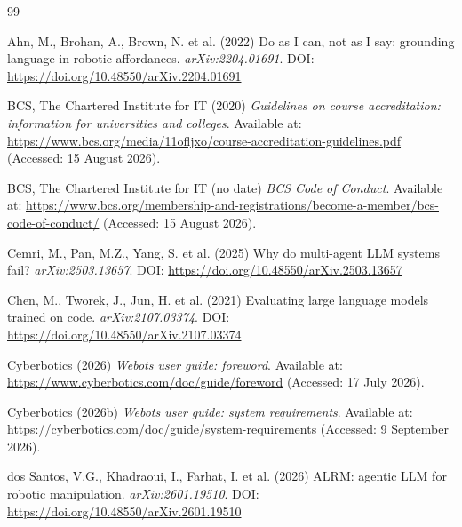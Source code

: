 \documentclass[11pt,a4paper]{report}
\begin{document}
\renewcommand{\bibname}{References}
\clearpage
{}
{}
\begin{thebibliography}{99}
\setlength{\itemsep}{0pt}
\setlength{\parsep}{0pt}

 Ahn, M., Brohan, A., Brown, N. et al. (2022) Do as I can, not as I say: grounding language in robotic affordances. \textit{arXiv:2204.01691}. DOI: \url{https://doi.org/10.48550/arXiv.2204.01691}

 BCS, The Chartered Institute for IT (2020) \textit{Guidelines on course accreditation: information for universities and colleges}. Available at: \url{https://www.bcs.org/media/11ofljxo/course-accreditation-guidelines.pdf} (Accessed: 15 August 2026).

 BCS, The Chartered Institute for IT (no date) \textit{BCS Code of Conduct}. Available at: \url{https://www.bcs.org/membership-and-registrations/become-a-member/bcs-code-of-conduct/} (Accessed: 15 August 2026).

 Cemri, M., Pan, M.Z., Yang, S. et al. (2025) Why do multi-agent LLM systems fail? \textit{arXiv:2503.13657}. DOI: \url{https://doi.org/10.48550/arXiv.2503.13657}

 Chen, M., Tworek, J., Jun, H. et al. (2021) Evaluating large language models trained on code. \textit{arXiv:2107.03374}. DOI: \url{https://doi.org/10.48550/arXiv.2107.03374}

 Cyberbotics (2026) \textit{Webots user guide: foreword}. Available at: \url{https://www.cyberbotics.com/doc/guide/foreword} (Accessed: 17 July 2026).

 Cyberbotics (2026b) \textit{Webots user guide: system requirements}. Available at: \url{https://cyberbotics.com/doc/guide/system-requirements} (Accessed: 9 September 2026).

 dos Santos, V.G., Khadraoui, I., Farhat, I. et al. (2026) ALRM: agentic LLM for robotic manipulation. \textit{arXiv:2601.19510}. DOI: \url{https://doi.org/10.48550/arXiv.2601.19510}


\end{thebibliography}
\end{document}

